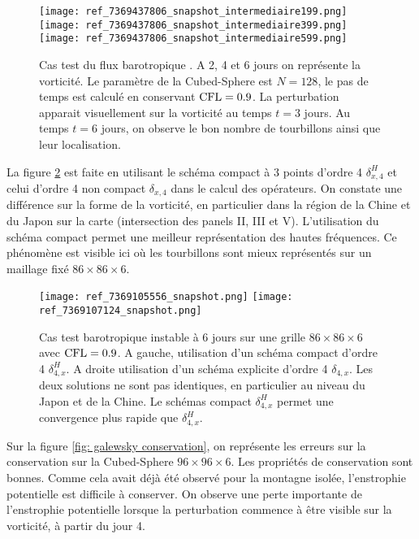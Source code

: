 \begin{figure}[htbp]
\begin{center}
\texttt{[image: ref\_7369437806\_snapshot\_intermediaire199.png]}
\texttt{[image: ref\_7369437806\_snapshot\_intermediaire399.png]}
\texttt{[image: ref\_7369437806\_snapshot\_intermediaire599.png]}
\end{center}
\caption{Cas test du flux barotropique \cite{Galewsky2004}. A 2, 4 et 6 jours on représente la vorticité. Le paramètre de la Cubed-Sphere est $N=128$, le pas de temps est calculé en conservant $\text{CFL}=0.9$. La perturbation apparait visuellement sur la vorticité au temps $t=3$ jours. Au temps $t=6$ jours, on observe le bon nombre de tourbillons ainsi que leur localisation.}
\label{fig: galewsky 246}
\end{figure}

La figure \ref{fig: galewsky compact/explicite} est faite en utilisant le schéma compact à 3 points d'ordre 4 $\delta_{x,4}^H$ et celui d'ordre 4 non compact $\delta_{x,4}$ dans le calcul des opérateurs. On constate une différence sur la forme de la vorticité, en particulier dans la région de la Chine et du Japon sur la carte (intersection des panels II, III et V). L'utilisation du schéma compact permet une meilleur représentation des hautes fréquences. Ce phénomène est visible ici où les tourbillons sont mieux représentés sur un maillage fixé $86 \times 86 \times 6$.

\begin{figure}[htbp]
\begin{center}
\texttt{[image: ref\_7369105556\_snapshot.png]}
\texttt{[image: ref\_7369107124\_snapshot.png]}
\end{center}
\caption{Cas test barotropique instable \cite{Galewsky2004} à 6 jours sur une grille $86 \times 86 \times 6$ avec $\text{CFL}=0.9$. A gauche, utilisation d'un schéma compact d'ordre 4 $\delta_{4,x}^H$. A droite utilisation d'un schéma explicite d'ordre 4 $\delta_{4,x}$. Les deux solutions ne sont pas identiques, en particulier au niveau du Japon et de la Chine. Le schémas compact $\delta_{4,x}^H$ permet une convergence plus rapide que $\delta_{4,x}^H$.}
\label{fig: galewsky compact/explicite}
\end{figure}

Sur la figure \ref{fig: galewsky conservation}, on représente les erreurs sur la conservation sur la Cubed-Sphere $96 \times 96 \times 6$. Les propriétés de conservation sont bonnes.  Comme cela avait déjà été observé pour la montagne isolée, l'enstrophie potentielle est difficile à conserver. On observe une perte importante de l'enstrophie potentielle lorsque la perturbation commence à être visible sur la vorticité, à partir du jour 4.

